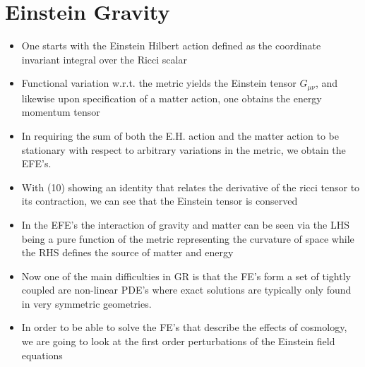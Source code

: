 \documentclass[10pt,letterpaper]{article}
\numberwithin{equation}{section}
\begin{document}

\section{Einstein Gravity}
\begin{itemize}
	\item One starts with the Einstein Hilbert action defined as the coordinate invariant integral over the Ricci scalar
	\item Functional variation w.r.t. the metric yields the Einstein tensor $G_{\mu\nu}$, and likewise upon specification of a matter action, one obtains the energy momentum tensor
	\item In requiring the sum of both the E.H. action and the matter action to be stationary with respect to arbitrary variations in the metric, we obtain the EFE's.
	\item With (10) showing an identity that relates the derivative of the ricci tensor to its contraction, we can see that the Einstein tensor is conserved
	\item In the EFE's the interaction of gravity and matter can be seen via the LHS being a pure function of the metric representing the curvature of space while the RHS defines the source of matter and energy
	\item Now one of the main difficulties in GR is that the FE's form a set of tightly coupled are non-linear PDE's where exact solutions are typically only found in very symmetric geometries. 
	\item In order to be able to solve the FE's that describe the effects of cosmology, we are going to look at the first order perturbations of the Einstein field equations
\end{itemize}

\end{document}
